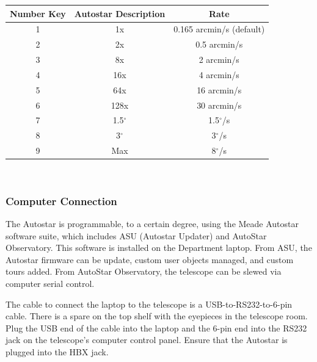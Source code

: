 \documentclass[12pt,titlepage]{article}
\renewcommand\deg{\mbox{$^\circ$}}
\begin{document}
\begin{center}  
\small{
\begin{tabular}{ccc}
Number Key	& Autostar Description	& Rate\\
\hline
1			& 1x				& 0.165 arcmin/s (default)\\[-1ex]
2			& 2x				& 0.5 arcmin/s\\[-1ex]
3			& 8x				& 2 arcmin/s\\[-1ex]
4			& 16x			& 4 arcmin/s\\[-1ex]
5			& 64x			& 16 arcmin/s\\[-1ex]
6			& 128x			& 30 arcmin/s\\[-1ex]
7			& 1.5$\deg$		& 1.5$\deg$/s\\[-1ex]
8			& 3$\deg$		& 3$\deg$/s\\[-1ex]
9 			& Max			& 8$\deg$/s

\end{tabular}}\\
				\label{tab:slew_speeds} 
\vspace{.4 cm}
\end{center}


\subsubsection{Computer Connection}
The Autostar is programmable, to a certain degree, using the Meade Autostar software suite, which includes ASU (Autostar Updater) and AutoStar Observatory. 
This software is installed on the Department laptop.
From ASU, the Autostar firmware can be update, custom user objects managed, and custom tours added.
From AutoStar Observatory, the telescope can be slewed via computer serial control.
\par The cable to connect the laptop to the telescope is a USB-to-RS232-to-6-pin cable.
There is a spare on the top shelf with the eyepieces in the telescope room.
Plug the USB end of the cable into the laptop and the 6-pin end into the RS232 jack on the telescope's computer control panel.
Ensure that the Autostar is plugged into the HBX jack.
\end{document}

